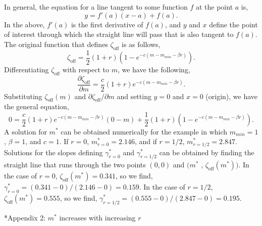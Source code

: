 \documentclass[12pt]{article}
\makeatletter
\renewcommand\section{\@startsection{section}{1}{0in}{-0.5\baselineskip}{0.1\baselineskip}{\normalfont\large\bfseries}}
\makeatother
\begin{document}
In general, the equation for a line tangent to some function $f$ at the point $a$ is,
\begin{equation}
y = f'\left(a\right)\left(x-a\right) + f\left(a\right).
\end{equation}
In the above, $f'(a)$ is the first derivative of $f(a)$, and $y$ and $x$ define the point of interest through which the straight line will pass that is also tangent to $f(a)$. The original function that defines $\zeta_{\textrm{off}}$ is as follows,
\begin{equation}
\zeta_{\textrm{off}} = \frac{1}{2}\left(1+r\right)\left(1-e^{-c\left(m-m_{min}-\beta r\right)}\right).
\end{equation}
Differentiating $\zeta_{\textrm{off}}$ with respect to $m$, we have the following,
\begin{equation}
\frac{\partial \zeta_{\textrm{off}}}{\partial m} = \frac{c}{2} \left(1+r\right)e^{-c\left(m-m_{min}-\beta r\right)}.
\end{equation}
Substituting $\zeta_{\textrm{off}}(m)$ and $\partial \zeta_{\textrm{off}} / \partial m$ and setting $y=0$ and $x=0$ (origin), we have the general equation, 
\begin{equation}
0 = \frac{c}{2} \left(1+r\right)e^{-c\left(m-m_{min}-\beta r\right)}\left(0-m\right) + \frac{1}{2}\left(1+r\right)\left(1-e^{-c\left(m-m_{min}-\beta r\right)}\right).
\end{equation}
A solution for $m^{*}$ can be obtained numerically for the example in which $m_{min}=1$, $\beta=1$, and $c=1$. If $r=0$, $m^{*}_{r=0}=2.146$, and if $r=1/2$, $m^{*}_{r=1/2}=2.847$. Solutions for the slopes defining $\gamma^{*}_{r=0}$ and $\gamma^{*}_{r=1/2}$ can be obtained by finding the straight line that runs through the two points $(0,0)$ and $(m^{*}$ , $\zeta_{\textrm{off}}(m^{*}))$. In the case of $r=0$, $\zeta_{\textrm{off}}(m^{*})=0.341$, so we find, $\gamma^{*}_{r=0}=(0.341 - 0)/(2.146 - 0)=0.159$. In the case of $r=1/2$, $\zeta_{\textrm{off}}(m^{*})=0.555$, so we find, $\gamma^{*}_{r=1/2}=(0.555-0)/(2.847-0)=0.195$. 

\section*{Appendix 2: $m^{*}$ increases with increasing $r$}
\end{document}
